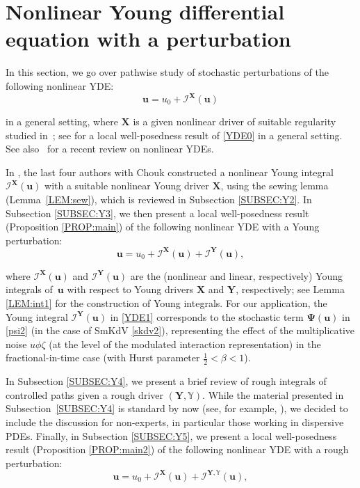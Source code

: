 \documentclass[letterpaper, 11pt,  reqno]{amsart}
\newcommand{\1}{\hspace{0.5mm}\textup{I}\hspace{0.5mm}}
\newcommand{\I}{\mathcal{I}}
\newcommand{\noi}{\noindent}
\newcommand{\be}{\beta}
\newcommand{\uu}{\mathbf{u}}
\newcommand{\z}{\zeta}
\newcommand{\YYb}{\mathbb{Y}}
\newcommand{\PPsi}{\pmb{\Psi}}
\newcommand{\XX}{\mathbf{X}}
\newcommand{\YY}{\mathbf{Y}}
\numberwithin{equation}{section}
\numberwithin{theorem}{section}
\begin{document}
\section{Nonlinear Young differential equation with a 
perturbation}
\label{SEC:Young}




In this section, we 
go over pathwise study of stochastic perturbations
of the following nonlinear YDE:
\begin{equation}
\label{YDE0}
\uu = u_0 + \I^\XX(\uu)
\end{equation}

\noi
in a general setting, 
where $\XX$ is a given nonlinear driver of suitable regularity
studied in~\cite{CGLLO1};
see \cite[Section~3]{CGLLO1}
for a local well-posedness result of \eqref{YDE0} in a general setting.
See also~\cite{G23} for a recent review on
nonlinear YDEs.







In \cite{CGLLO1}, 
the last four authors with Chouk  constructed 
 a nonlinear Young integral  $\I^\XX(\uu)$ 
with a suitable nonlinear Young driver $\XX$, using
 the sewing lemma (Lemma~\ref{LEM:sew}), 
 which is reviewed 
in Subsection \ref{SUBSEC:Y2}.
In Subsection \ref{SUBSEC:Y3}, 
we then present a  local well-posedness result 
(Proposition \ref{PROP:main})
of the following 
nonlinear YDE with a Young perturbation:
\begin{equation}
\label{YDE1}
\uu = u_0 + \I^\XX(\uu) + \I^\YY(\uu), 
\end{equation}

\noi
where
$\I^\XX(\uu)$
and $\I^\YY(\uu)$
are the (nonlinear and linear, respectively)
Young integrals of~$\uu$
with respect to 
Young drivers $\XX$ and $\YY$, respectively;
see Lemma \ref{LEM:int1}
for the construction of Young integrals.
For our application, 
the Young integral
$\I^\YY(\uu)$ in \eqref{YDE1} corresponds
to 
the stochastic term $\PPsi(\uu)$
in \eqref{psi2} (in the case of SmKdV \eqref{skdv2}), 
representing the effect of the multiplicative noise
$u \phi \z$ (at the level of the modulated interaction representation)
in the fractional-in-time case (with Hurst
parameter $\frac 12 < \be < 1$).



In Subsection \ref{SUBSEC:Y4}, 
we present a brief review
of rough integrals of controlled paths
given a rough driver $(\YY, \YYb)$.
While the material presented 
in Subsection~\ref{SUBSEC:Y4}
is standard by now
(see, for example, \cite{Gub04, FH20}), 
we decided to include the discussion 
for non-experts, in particular those working in dispersive PDEs.
Finally, in Subsection \ref{SUBSEC:Y5}, 
we present a local well-posedness result
(Proposition \ref{PROP:main2})
of the 
following nonlinear YDE with a rough perturbation:
\begin{equation}
\label{YDE1a}
\uu = u_0 + \I^\XX(\uu) + \I^{\YY, \mathbb{Y}}(\uu), 
\end{equation}
\end{document}
